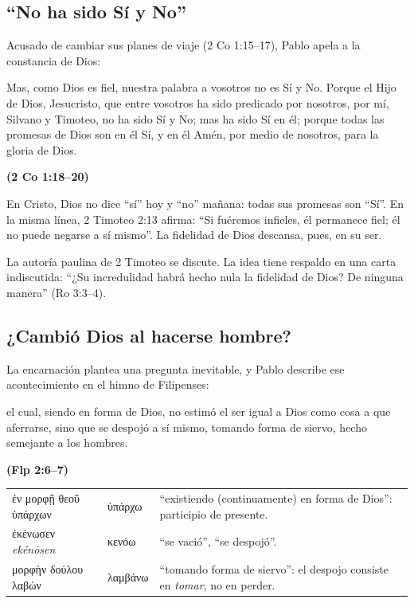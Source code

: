 \documentclass[11pt,letterpaper]{article}
\newcommand{\grc}[1]{\foreignlanguage{ancientgreek}{#1}}
\newcommand{\fuente}[1]{\par\hfill{\upshape\bfseries\small\textcolor{azul}{#1}}}
\begin{document}
\subsection{``No ha sido Sí y No''}
Acusado de cambiar sus planes de viaje (2 Co 1:15--17), Pablo apela a la constancia de Dios:

\begin{cita}Mas, como Dios es fiel, nuestra palabra a vosotros no es Sí y No. Porque el Hijo de Dios, Jesucristo, que entre vosotros ha sido predicado por nosotros, por mí, Silvano y Timoteo, no ha sido Sí y No; mas ha sido Sí en él; porque todas las promesas de Dios son en él Sí, y en él Amén, por medio de nosotros, para la gloria de Dios.\fuente{(2 Co 1:18--20)}\end{cita}

En Cristo, Dios no dice ``sí'' hoy y ``no'' mañana: todas sus promesas son ``Sí''. En la misma línea, 2 Timoteo 2:13 afirma: ``Si fuéremos infieles, él permanece fiel; él no puede negarse a sí mismo''. La fidelidad de Dios descansa, pues, en su ser.

\begin{nota}[Precisión]
La autoría paulina de 2 Timoteo se discute. La idea tiene respaldo en una carta indiscutida: ``¿Su incredulidad habrá hecho nula la fidelidad de Dios? De ninguna manera'' (Ro 3:3--4).
\end{nota}

\subsection{¿Cambió Dios al hacerse hombre?}
La encarnación plantea una pregunta inevitable, y Pablo describe ese acontecimiento en el himno de Filipenses:

\begin{cita}el cual, siendo en forma de Dios, no estimó el ser igual a Dios como cosa a que aferrarse, sino que se despojó a sí mismo, tomando forma de siervo, hecho semejante a los hombres.\fuente{(Flp 2:6--7)}\end{cita}

\begin{filologia}[Flp 2:6--7]
\begin{tabular}{@{}L{3.2cm}L{1.6cm}L{10cm}@{}}
\grc{ἐν μορφῇ θεοῦ ὑπάρχων} & \grc{ὑπάρχω} & ``existiendo (continuamente) en forma de Dios'': participio de presente. \\[2pt]
\grc{ἐκένωσεν} \emph{ekénōsen} & \grc{κενόω} & ``se vació'', ``se despojó''. \\[2pt]
\grc{μορφὴν δούλου λαβών} & \grc{λαμβάνω} & ``tomando forma de siervo'': el despojo consiste en \emph{tomar}, no en perder. \\
\end{tabular}
\end{filologia}
\end{document}

